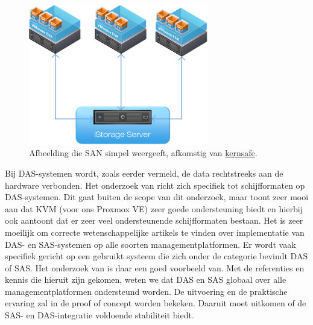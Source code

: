 \begin{figure}[h!]
  \centering
  \includegraphics[width=0.7\textwidth]{../onderzoek/nas-isci.png} 
  \caption{Afbeelding die SAN simpel weergeeft, afkomstig van \href{https://www.kernsafe.com/images/VMware-iSCSI-iStorage-Server.png}{kernsafe}.}
  \label{fig:san}
\end{figure}


\FloatBarrier
Bij DAS-systemen wordt, zoals eerder vermeld, de data rechtstreeks aan de hardware verbonden. Het onderzoek van \textcite{joshi2014empirical} richt zich specifiek tot schijfformaten op DAS-systemen.
Dit gaat buiten de scope van dit onderzoek, maar toont zeer mooi aan dat KVM (voor ons Proxmox VE) zeer goede ondersteuning biedt en hierbij ook aantoont dat er zeer veel ondersteunende schijfformaten bestaan.
Het is zeer moeilijk om correcte wetenschappelijke artikels te vinden over implementatie van DAS- en SAS-systemen op alle soorten managementplatformen. Er wordt vaak specifiek gericht op een gebruikt systeem die zich onder de categorie bevindt DAS of SAS. Het onderzoek van \textcite{joshi2014empirical} is daar een goed voorbeeld van.
Met de referenties en kennis die hieruit zijn gekomen, weten we dat DAS en SAS globaal over alle managementplatformen ondersteund worden. De uitvoering en de praktische ervaring zal in de proof of concept worden bekeken. Daaruit moet uitkomen of de SAS- en DAS-integratie voldoende stabiliteit biedt.

